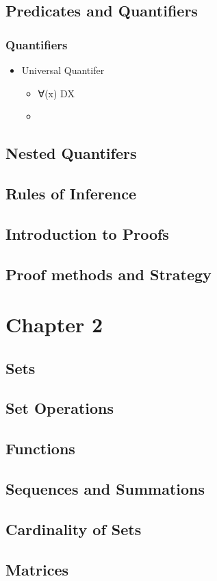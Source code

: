 \documentclass[11pt]{article}
\begin{document}
\subsection{Predicates and Quantifiers}
\label{sec-1-4}
\subsubsection{Quantifiers}
\label{sec-1-4-1}
\begin{itemize}

\item Universal Quantifer
\label{sec-1-4-1-1}%
\begin{itemize}

\item ∀(x) DX
\label{sec-1-4-1-1-1}%

\item \guillemotleft{}
\label{sec-1-4-1-1-2}%
\end{itemize} %
\end{itemize} %
\subsection{Nested Quantifers}
\label{sec-1-5}
\subsection{Rules of Inference}
\label{sec-1-6}
\subsection{Introduction to Proofs}
\label{sec-1-7}
\subsection{Proof methods and Strategy}
\label{sec-1-8}
\section{Chapter 2}
\label{sec-2}
\subsection{Sets}
\label{sec-2-1}
\subsection{Set Operations}
\label{sec-2-2}
\subsection{Functions}
\label{sec-2-3}
\subsection{Sequences and Summations}
\label{sec-2-4}
\subsection{Cardinality of Sets}
\label{sec-2-5}
\subsection{Matrices}
\label{sec-2-6}
\end{document}
